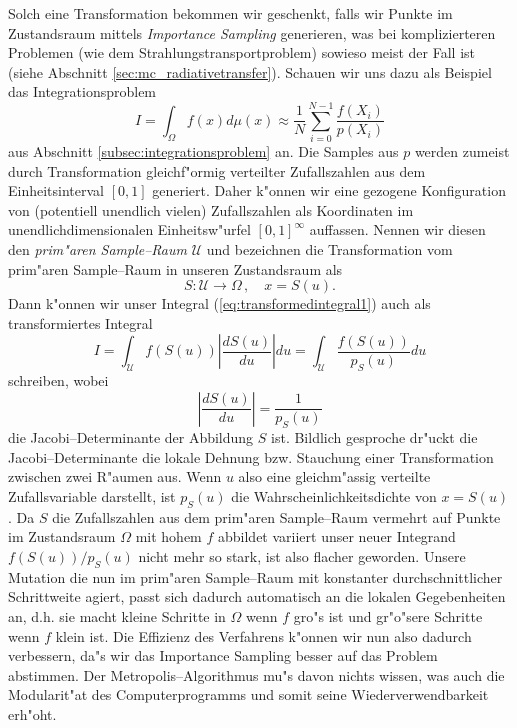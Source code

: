	Solch eine Transformation bekommen wir geschenkt, falls wir Punkte im Zustandsraum mittels {\em Importance Sampling} generieren, was bei komplizierteren Problemen (wie dem Strahlungstransportproblem) sowieso meist der Fall ist (siehe Abschnitt \ref{sec:mc_radiativetransfer}). Schauen wir uns dazu als Beispiel das Integrationsproblem
	\begin{equation}
		I=\int_\Omega f(x) d\mu(x)\approx \frac{1}{N}\sum_{i=0}^{N-1} \frac{f(X_i)}{p(X_i)}
		\label{eq:transformedintegral1}
	\end{equation}
	aus Abschnitt \ref{subsec:integrationsproblem} an. Die Samples aus $p$ werden zumeist durch Transformation gleichf"ormig verteilter Zufallszahlen aus dem Einheitsinterval $[0,1]$ generiert. Daher k"onnen wir eine gezogene Konfiguration von (potentiell unendlich vielen) Zufallszahlen als Koordinaten im unendlichdimensionalen Einheitsw"urfel $[0,1]^\infty$ auffassen. Nennen wir diesen den {\em prim"aren Sample--Raum} $\mathcal{U}$ und bezeichnen die Transformation vom prim"aren Sample--Raum in unseren Zustandsraum als
	$$S : \mathcal{U} \to \Omega\,,\quad x=S(u).$$
	Dann k"onnen wir unser Integral (\ref{eq:transformedintegral1}) auch als transformiertes Integral
	$$I=\int_\mathcal{U} f(S(u)) \left|\frac{dS(u)}{du}\right|du=\int_\mathcal{U} \frac{f(S(u))}{p_S(u)}du$$
	schreiben, wobei
	$$\left|\frac{dS(u)}{du}\right|=\frac{1}{p_S(u)}$$
	die Jacobi--Determinante der Abbildung $S$ ist. Bildlich gesproche dr"uckt die Jacobi--Determinante die lokale Dehnung bzw. Stauchung einer Transformation zwischen zwei R"aumen aus. Wenn $u$ also eine gleichm"assig verteilte Zufallsvariable darstellt, ist $p_S(u)$ die Wahrscheinlichkeitsdichte von $x=S(u)$. Da $S$ die Zufallszahlen aus dem prim"aren Sample--Raum vermehrt auf Punkte im Zustandsraum $\Omega$ mit hohem $f$ abbildet variiert unser neuer Integrand $f(S(u))/p_S(u)$ nicht mehr so stark, ist also flacher geworden. Unsere Mutation die nun im prim"aren Sample--Raum mit konstanter durchschnittlicher Schrittweite agiert, passt sich dadurch automatisch an die lokalen Gegebenheiten an, d.h. sie macht kleine Schritte in $\Omega$ wenn $f$ gro"s ist und gr"o"sere Schritte wenn $f$ klein ist. Die Effizienz des Verfahrens k"onnen wir nun also dadurch verbessern, da"s wir das Importance Sampling besser auf das Problem abstimmen. Der Metropolis--Algorithmus mu"s davon nichts wissen, was auch die Modularit"at des Computerprogramms und somit seine Wiederverwendbarkeit erh"oht.

